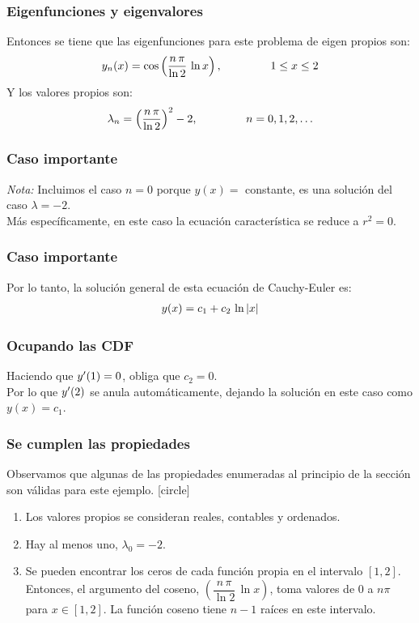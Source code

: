 \documentclass[12pt]{beamer}
\begin{document}
\begin{frame}
\frametitle{Eigenfunciones y eigenvalores}
Entonces se tiene que las eigenfunciones para este problema de eigen propios son:
\pause
\begin{align*}
y_{n}(x) = \cos \left( \dfrac{n \, \pi}{\ln 2} \, \ln x \right), \hspace{1.5cm} 1 \leq x \leq 2
\end{align*}
\pause
Y los valores propios son:
\pause
\begin{align*}
\lambda_{n} = \left( \dfrac{n \, \pi}{\ln 2} \right)^{2} - 2, \hspace{1.5cm} n = 0, 1, 2, \ldots
\end{align*}
\end{frame}
\begin{frame}
\frametitle{Caso importante}
\emph{Nota:} Incluimos el caso $n = 0$ porque $y (x) =$ constante, es una solución del caso $\lambda = - 2$.
\\
\bigskip
\pause
Más específicamente, en este caso la ecuación característica se reduce a $r^{2} = 0$.
\end{frame}
\begin{frame}
\frametitle{Caso importante}
Por lo tanto, la solución general de esta ecuación de Cauchy-Euler es:
\pause
\begin{align*}
y (x) = c_{1} + c_{2} \, \ln \abs{x}
\end{align*}
\end{frame}
\begin{frame}
\frametitle{Ocupando las CDF}
Haciendo que ${y}^{\prime} (1) = 0$, obliga que $c_{2} = 0$.
\\
\bigskip
\pause
Por lo que ${y}^{\prime} (2)$ se anula automáticamente, dejando la solución en este caso como $y(x) = c_{1}$.
\end{frame}
\begin{frame}
\frametitle{Se cumplen las propiedades}
Observamos que algunas de las propiedades enumeradas al principio de la sección son válidas para este ejemplo.
\pause
{}
[circle]
\begin{enumerate}[<+->]
\item Los valores propios se consideran reales, contables y ordenados.
\item Hay al menos uno, $\lambda_{0} = -2$.
\item Se pueden encontrar los ceros de cada función propia en el intervalo $[1, 2]$. \pause Entonces, el argumento del coseno, $\left( \dfrac{n \, \pi}{\ln 2} \, \ln x \right)$, toma valores de $0$ a $n \pi$ para $x \in [1, 2]$. \pause La función coseno tiene $n - 1$ raíces en este intervalo.
\seti
\end{enumerate}
\end{frame}
\end{document}
